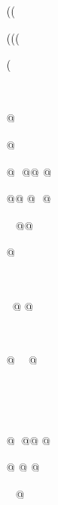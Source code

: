 ((









(((









(












@


@



@
@@
@

@@@
@















@@










@







@@












@

@








@@@@

@
@
@



@
























